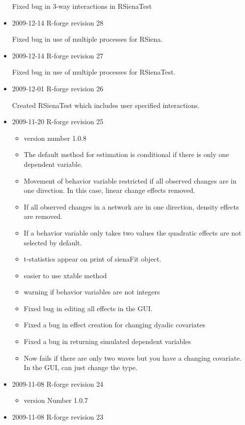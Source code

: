 \documentclass[a4paper,fleqn,11pt]{article}
\newcommand{\+}{\, + \,}
\newcommand{\sfn}[1]{\textsf{#1}}
\begin{document}
\begin{small}
\begin{itemize}
Fixed bug in 3-way interactions in RSienaTest

\item 2009-12-14 R-forge revision 28

 Fixed bug in use of multiple processes for RSiena.

\item 2009-12-14 R-forge revision 27

Fixed bug in use of multiple processes for
  RSienaTest.

\item 2009-12-01 R-forge revision 26

Created RSienaTest which includes user
  specified interactions.

\item 2009-11-20 R-forge revision 25

  \begin{itemize}
  \item  version number 1.0.8
  \item The default method for estimation is conditional if there is only one
    dependent variable.
  \item Movement of behavior variable restricted if all observed changes are in
    one direction. In this case, linear change effects removed.
  \item If all observed changes in a network are in one direction, density
    effects are removed.
  \item If a behavior variable only takes two values the quadratic effects
    are not selected by default.
  \item t-statistics appear on print of \sfn{sienaFit} object.
  \item easier to use \sfn{xtable} method
  \item warning if behavior variables are not integers
  \item Fixed bug in editing all effects in the GUI.
  \item Fixed a bug in effect creation for changing dyadic covariates
  \item Fixed a bug in returning simulated dependent variables
  \item Now fails if there are only two waves but you have a changing
    covariate. In the GUI, can just change the type.
  \end{itemize}

\item 2009-11-08 R-forge revision 24

  \begin{itemize}
  \item
    version Number 1.0.7
  \end{itemize}
\item  2009-11-08 R-forge revision 23


\end{itemize}
\end{small}
\end{document}
